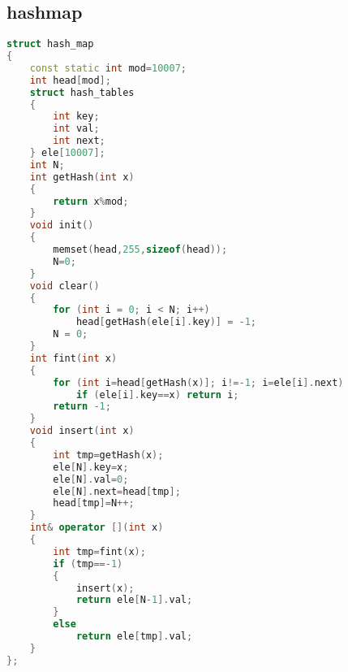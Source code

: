 \subsection{hashmap}
	\begin{lstlisting}[language=c++]
struct hash_map
{
	const static int mod=10007;
	int head[mod];
	struct hash_tables
	{
		int key;
		int val;
		int next;
	} ele[10007];
	int N;
	int getHash(int x)
	{
		return x%mod;
	}
	void init()
	{
		memset(head,255,sizeof(head));
		N=0;
	}
	void clear()
	{
		for (int i = 0; i < N; i++)
			head[getHash(ele[i].key)] = -1;
		N = 0;
	}
	int fint(int x)
	{
		for (int i=head[getHash(x)]; i!=-1; i=ele[i].next)
			if (ele[i].key==x) return i;
		return -1;
	}
	void insert(int x)
	{
		int tmp=getHash(x);
		ele[N].key=x;
		ele[N].val=0;
		ele[N].next=head[tmp];
		head[tmp]=N++;
	}
	int& operator [](int x)
	{
		int tmp=fint(x);
		if (tmp==-1)
		{
			insert(x);
			return ele[N-1].val;
		}
		else
			return ele[tmp].val;
	}
};
	\end{lstlisting}
